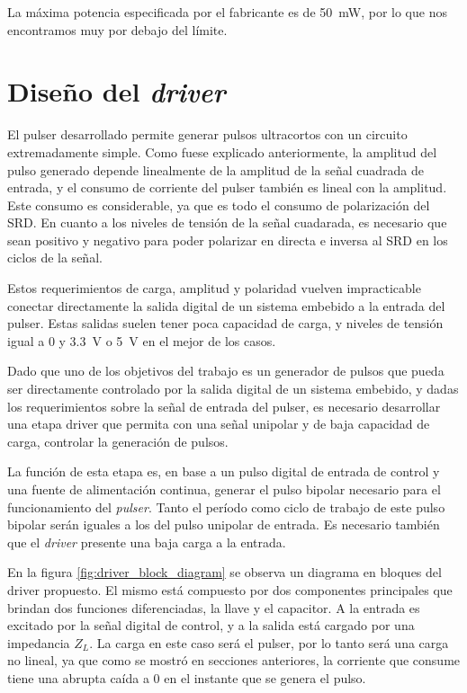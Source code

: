 La máxima potencia especificada por el fabricante es de \qty{50}{\milli\watt},
por lo que nos encontramos muy por debajo del límite.

\section{Diseño del \textit{driver}}

El pulser desarrollado permite generar pulsos ultracortos con un circuito
extremadamente simple. Como fuese explicado anteriormente, la amplitud del pulso
generado depende linealmente de la amplitud de la señal cuadrada de entrada, y
el consumo de corriente del pulser también es lineal con la amplitud. Este
consumo es considerable, ya que es todo el consumo de polarización del SRD. En
cuanto a los niveles de tensión de la señal cuadarada, es necesario que sean
positivo y negativo para poder polarizar en directa e inversa al SRD en los
ciclos de la señal.

Estos requerimientos de carga, amplitud y polaridad vuelven impracticable conectar
directamente la salida digital de un sistema embebido a la entrada del pulser.
Estas salidas suelen tener poca capacidad de carga, y niveles de tensión igual a
$0$ y \qty{3.3}{\volt} o \qty{5}{\volt} en el mejor de los casos.

Dado que uno de los objetivos del trabajo es un generador de pulsos que pueda
ser directamente controlado por la salida digital de un sistema embebido, y
dadas los requerimientos sobre la señal de entrada del pulser, es necesario
desarrollar una etapa driver que permita con una señal unipolar y de baja
capacidad de carga, controlar la generación de pulsos.

La función de esta etapa es, en base a un pulso digital de entrada de control y
una fuente de alimentación continua, generar el pulso bipolar necesario para el
funcionamiento del \textit{pulser}. Tanto el período como ciclo de trabajo de
este pulso bipolar serán iguales a los del pulso unipolar de entrada. Es
necesario también que el \textit{driver} presente una baja carga a la entrada.

En la figura \ref{fig:driver_block_diagram} se observa un diagrama en bloques
del driver propuesto. El mismo está compuesto por dos componentes principales
que brindan dos funciones diferenciadas, la llave y el capacitor. A la entrada
es excitado por la señal digital de control, y a la salida está cargado por una
impedancia $Z_L$. La carga en este caso será el pulser, por lo tanto será una
carga no lineal, ya que como se mostró en secciones anteriores, la corriente que
consume tiene una abrupta caída a 0 en el instante que se genera el pulso.

